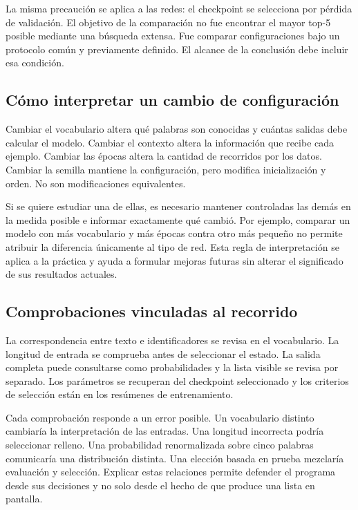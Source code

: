 La misma precaución se aplica a las redes: el checkpoint se selecciona por pérdida de validación. El objetivo de la comparación no fue encontrar el mayor top-5 posible mediante una búsqueda extensa. Fue comparar configuraciones bajo un protocolo común y previamente definido. El alcance de la conclusión debe incluir esa condición.

\subsection{Cómo interpretar un cambio de configuración}
Cambiar el vocabulario altera qué palabras son conocidas y cuántas salidas debe calcular el modelo. Cambiar el contexto altera la información que recibe cada ejemplo. Cambiar las épocas altera la cantidad de recorridos por los datos. Cambiar la semilla mantiene la configuración, pero modifica inicialización y orden. No son modificaciones equivalentes.

Si se quiere estudiar una de ellas, es necesario mantener controladas las demás en la medida posible e informar exactamente qué cambió. Por ejemplo, comparar un modelo con más vocabulario y más épocas contra otro más pequeño no permite atribuir la diferencia únicamente al tipo de red. Esta regla de interpretación se aplica a la práctica y ayuda a formular mejoras futuras sin alterar el significado de sus resultados actuales.

\subsection{Comprobaciones vinculadas al recorrido}
La correspondencia entre texto e identificadores se revisa en el vocabulario. La longitud de entrada se comprueba antes de seleccionar el estado. La salida completa puede consultarse como probabilidades y la lista visible se revisa por separado. Los parámetros se recuperan del checkpoint seleccionado y los criterios de selección están en los resúmenes de entrenamiento.

Cada comprobación responde a un error posible. Un vocabulario distinto cambiaría la interpretación de las entradas. Una longitud incorrecta podría seleccionar relleno. Una probabilidad renormalizada sobre cinco palabras comunicaría una distribución distinta. Una elección basada en prueba mezclaría evaluación y selección. Explicar estas relaciones permite defender el programa desde sus decisiones y no solo desde el hecho de que produce una lista en pantalla.
